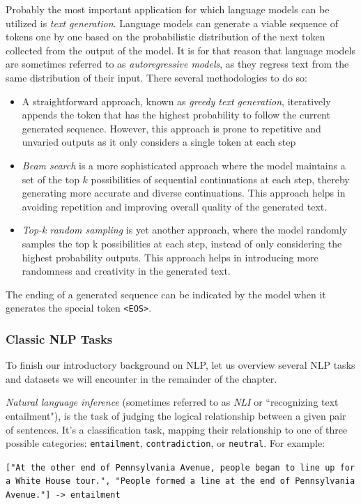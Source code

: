 \documentclass{article}
\begin{document}
\medskip
\noindent
Probably the most important application for which language models can be utilized is \emph{text generation}. Language models can generate a viable sequence of tokens one by one based on the probabilistic distribution of the next token collected from the output of the model. It is for that reason that language models are sometimes referred to as \emph{autoregressive models}, as they regress text from the same distribution of their input. There several methodologies to do so:
\begin{itemize}
    \item 
        A straightforward approach, known as \emph{greedy text generation}, iteratively appends the token that has the highest probability to follow the current generated sequence. However, this approach is prone to repetitive and unvaried outputs as it only considers a single token at each step
    \item
        \emph{Beam search} is a more sophisticated approach where the model maintains a set of the top $k$ possibilities of sequential continuations at each step, thereby generating more accurate and diverse continuations. This approach helps in avoiding repetition and improving overall quality of the generated text.
    \item
        \emph{Top-k random sampling} is yet another approach, where the model randomly samples the top k possibilities at each step, instead of only considering the highest probability outputs. This approach helps in introducing more randomness and creativity in the generated text.
\end{itemize}
The ending of a generated sequence can be indicated by the model when it generates the special token \texttt{<EOS>}.


\subsubsection{Classic NLP Tasks}
\label{subsec:nlp-tasks}

To finish our introductory background on NLP, let us overview several NLP tasks and datasets we will encounter in the remainder of the chapter.

\medskip
\noindent
\emph{Natural language inference} (sometimes referred to as \emph{NLI} or ``recognizing text entailment"), is the task of judging the logical relationship between a given pair of sentences. It's a classification task, mapping their relationship to one of three possible categories: \texttt{entailment}, \texttt{contradiction}, or \texttt{neutral}. For example:
\begin{center}
    \texttt{["At the other end of Pennsylvania Avenue, people began to line up for a White House tour.", "People formed a line at the end of Pennsylvania Avenue."] -> entailment}
\end{center}
\end{document}
